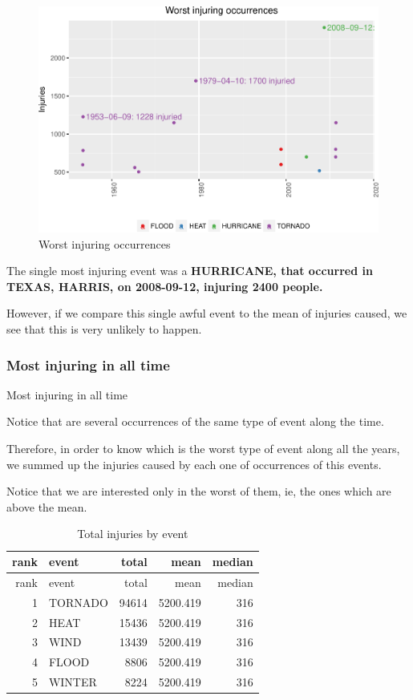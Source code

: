 \documentclass[]{article}
\begin{document}
\begin{figure}[htbp]
\centering
\includegraphics{readme_files/figure-latex/injuring-single-plot-1.pdf}
\caption{Worst injuring occurrences}
\end{figure}

The single most injuring event was a \textbf{HURRICANE, that occurred in
TEXAS, HARRIS, on 2008-09-12, injuring 2400 people.}

However, if we compare this single awful event to the mean of injuries
caused, we see that this is very unlikely to happen.

\subsubsection{Most injuring in all
time}\label{most-injuring-in-all-time}

Most injuring in all time

Notice that are several occurrences of the same type of event along the
time.

Therefore, in order to know which is the worst type of event along all
the years, we summed up the injuries caused by each one of occurrences
of this events.

Notice that we are interested only in the worst of them, ie, the ones
which are above the mean.

\begin{longtable}[]{@{}rlrrr@{}}
\caption{Total injuries by event}\tabularnewline
\toprule
rank & event & total & mean & median\tabularnewline
\midrule
\endfirsthead
\toprule
rank & event & total & mean & median\tabularnewline
\midrule
\endhead
1 & TORNADO & 94614 & 5200.419 & 316\tabularnewline
2 & HEAT & 15436 & 5200.419 & 316\tabularnewline
3 & WIND & 13439 & 5200.419 & 316\tabularnewline
4 & FLOOD & 8806 & 5200.419 & 316\tabularnewline
5 & WINTER & 8224 & 5200.419 & 316\tabularnewline
\bottomrule
\end{longtable}
\end{document}
